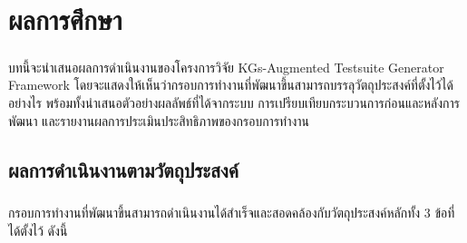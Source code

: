 \chapter{ผลการศึกษา}\label{ch:results}

\paragraph{}
บทนี้จะนำเสนอผลการดำเนินงานของโครงการวิจัย KGs-Augmented Testsuite Generator Framework โดยจะแสดงให้เห็นว่ากรอบการทำงานที่พัฒนาขึ้นสามารถบรรลุวัตถุประสงค์ที่ตั้งไว้ได้อย่างไร พร้อมทั้งนำเสนอตัวอย่างผลลัพธ์ที่ได้จากระบบ การเปรียบเทียบกระบวนการก่อนและหลังการพัฒนา และรายงานผลการประเมินประสิทธิภาพของกรอบการทำงาน

\section{ผลการดำเนินงานตามวัตถุประสงค์}\label{sec:}

\paragraph{}
กรอบการทำงานที่พัฒนาขึ้นสามารถดำเนินงานได้สำเร็จและสอดคล้องกับวัตถุประสงค์หลักทั้ง 3 ข้อที่ได้ตั้งไว้ ดังนี้

